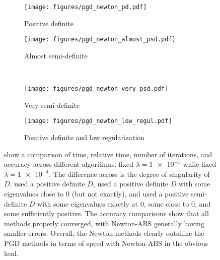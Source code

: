 \begin{figure}
    \centering
    \begin{subfigure}[b]{0.49\textwidth}
        \centering
        \texttt{[image: figures/pgd\_newton\_pd.pdf]}
        \caption{Positive definite}
        \label{fig:bench:pgd-newton:pd}
    \end{subfigure} 
    \hfill
    \begin{subfigure}[b]{0.49\textwidth}
        \centering
        \texttt{[image: figures/pgd\_newton\_almost\_psd.pdf]}
        \caption{Almost semi-definite}
        \label{fig:bench:pgd-newton:almost_psd}
    \end{subfigure} 
    \\
    \begin{subfigure}[b]{0.49\textwidth}
        \centering
        \texttt{[image: figures/pgd\_newton\_very\_psd.pdf]}
        \caption{Very semi-definite}
        \label{fig:bench:pgd-newton:very_psd}
    \end{subfigure} 
    \hfill
    \begin{subfigure}[b]{0.49\textwidth}
        \centering
        \texttt{[image: figures/pgd\_newton\_low\_regul.pdf]}
        \caption{Positive definite and low regularization}
        \label{fig:bench:pgd-newton:low_regul}
    \end{subfigure} 
    \caption{%
        show a comparison of time, relative time, number of iterations, and accuracy
        across different algorithms.
         fixed $\lambda=\num{1e-1}$ while 
         fixed $\lambda=\num{1e-4}$.
        The difference across
         is the degree of singularity of $D$.
         used a positive definite $D$,
         used a positive definite $D$ with
        some eigenvalues close to $0$ (but not exactly), and
         used a positive semi-definite $D$
        with some eigenvalues exactly at $0$, some close to $0$, and some sufficiently positive.
        The accuracy comparisons show that all methods properly converged,
        with Newton-ABS generally having smaller errors.
        Overall, the Newton methods clearly outshine the PGD methods in terms of speed
        with Newton-ABS in the obvious lead.
    }
    \label{fig:bench:pgd-newton}
\end{figure}
